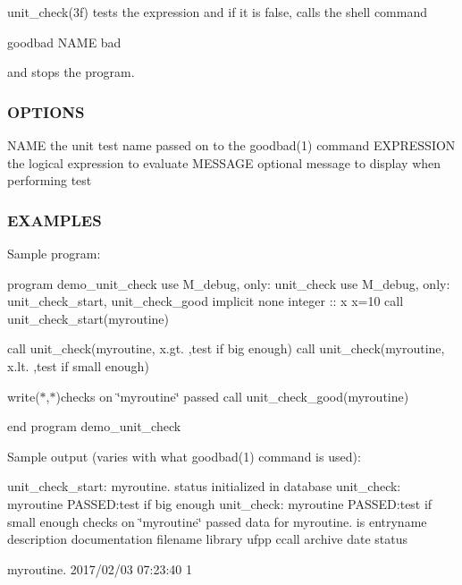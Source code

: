 \begin{DoxyVerb}unit_check(3f) tests the expression and if it is false, calls the shell command

     goodbad NAME bad

and stops the program.
\end{DoxyVerb}
 \subsubsection*{O\+P\+T\+I\+O\+NS}

N\+A\+ME the unit test name passed on to the goodbad(1) command E\+X\+P\+R\+E\+S\+S\+I\+ON the logical expression to evaluate M\+E\+S\+S\+A\+GE optional message to display when performing test

\subsubsection*{E\+X\+A\+M\+P\+L\+ES}

Sample program\+:

program demo\+\_\+unit\+\_\+check use M\+\_\+debug, only\+: unit\+\_\+check use M\+\_\+debug, only\+: unit\+\_\+check\+\_\+start, unit\+\_\+check\+\_\+good implicit none integer \+:\+: x x=10 call unit\+\_\+check\+\_\+start(\textquotesingle{}myroutine\textquotesingle{})

call unit\+\_\+check(\textquotesingle{}myroutine\textquotesingle{}, x.\+gt. ,\textquotesingle{}test if big enough\textquotesingle{}) call unit\+\_\+check(\textquotesingle{}myroutine\textquotesingle{}, x.\+lt. ,\textquotesingle{}test if small enough\textquotesingle{})

write($\ast$,$\ast$)\textquotesingle{}checks on \char`\"{}myroutine\char`\"{} passed\textquotesingle{} call unit\+\_\+check\+\_\+good(\textquotesingle{}myroutine\textquotesingle{})

end program demo\+\_\+unit\+\_\+check

Sample output (varies with what goodbad(1) command is used)\+:

unit\+\_\+check\+\_\+start\+: myroutine. status initialized in database unit\+\_\+check\+: myroutine P\+A\+S\+S\+ED\+:test if big enough unit\+\_\+check\+: myroutine P\+A\+S\+S\+ED\+:test if small enough checks on \char`\"{}myroutine\char`\"{} passed data for myroutine. is entryname description documentation filename library ufpp ccall archive date status 

 myroutine. 2017/02/03 07\+:23\+:40 1 

